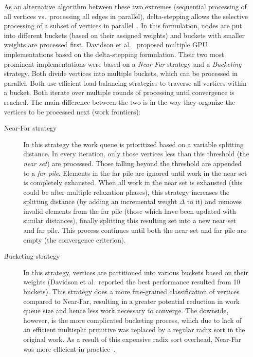 As an alternative algorithm between these two extremes (sequential processing of all vertices vs.\ processing all edges in parallel), delta-stepping allows the selective processing of a subset of vertices in parallel~\cite{Meyer:2003:DAP}.
In this formulation, nodes are put into different buckets (based on their assigned weights) and buckets with smaller weights are processed first.
Davidson et al.~\cite{Davidson:2014:WPG:nourl} proposed multiple GPU implementations based on the delta-stepping formulation. Their two most prominent implementations were based on a \emph{Near-Far} strategy and a \emph{Bucketing} strategy.
Both divide vertices into multiple buckets, which can be processed in parallel.
Both use efficient load-balancing strategies to traverse all vertices within a bucket.
Both iterate over multiple rounds of processing until convergence is reached.
The main difference between the two is in the way they organize the vertices to be processed next (work frontiers):
\begin{description}
        \item[Near-Far strategy] In this strategy the work queue is prioritized based on a variable splitting distance. In every iteration, only those vertices less than this threshold (the \emph{near set}) are processed. Those falling beyond the threshold are appended to a \emph{far pile}. Elements in the far pile are ignored until work in the near set is completely exhausted.
        When all work in the near set is exhausted (this could be after multiple relaxation phases), this strategy increases the splitting distance (by adding an incremental weight $\Delta$ to it) and removes invalid elements from the far pile (those which have been updated with similar distances), finally splitting this resulting set into a new near set and far pile. This process continues until both the near set and far pile are empty (the convergence criterion).
        \item[Bucketing strategy] In this strategy, vertices are partitioned into various buckets based on their weights (Davidson et al.\ reported the best performance resulted from 10 buckets). This strategy does a more fine-grained classification of vertices compared to Near-Far, resulting in a greater potential reduction in work queue size and hence less work necessary to converge. The downside, however, is the more complicated bucketing process, which due to lack of an efficient multisplit primitive was replaced by a regular radix sort in the original work. As a result of this expensive radix sort overhead, Near-Far was more efficient in practice~\cite{Davidson:2014:WPG:nourl}.
\end{description}

